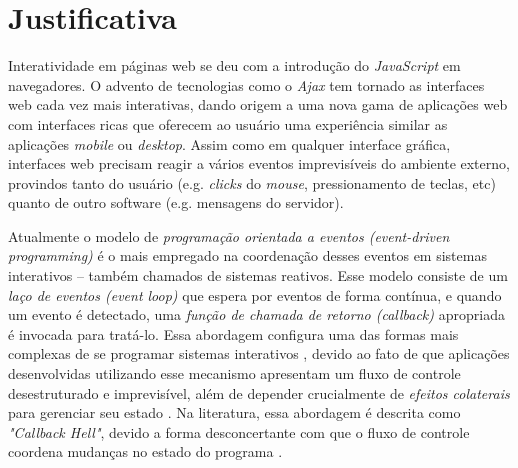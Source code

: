 \section{Justificativa}\label{ljustificativa}

Interatividade em páginas web se deu com a
introdução do \emph{JavaScript} em navegadores.
O advento de tecnologias como o \emph{Ajax} tem tornado as interfaces
web cada vez mais interativas,
dando origem a uma nova gama de aplicações web
com interfaces ricas que oferecem ao usuário uma experiência
similar as aplicações \textit{mobile} ou \textit{desktop}.
Assim como em qualquer interface gráfica, interfaces web
precisam reagir a vários eventos imprevisíveis do ambiente
externo, provindos tanto do usuário (e.g. \textit{clicks}
do \textit{mouse}, pressionamento de teclas, etc)
quanto de outro software (e.g. mensagens do servidor).

Atualmente o modelo de \emph{programação orientada a eventos
(event-driven programming)} é o mais empregado na
coordenação desses eventos em sistemas interativos
-- também chamados de sistemas reativos.
Esse modelo consiste de um \emph{laço de eventos (event loop)} que espera por
eventos de forma contínua, e quando um evento é detectado,
uma \emph{função de chamada de retorno (callback)}
apropriada é invocada para tratá-lo.
Essa abordagem configura uma das formas mais complexas de se
programar sistemas interativos \cite{
  edwards2009coherent,
  maier2010deprecating,
  reppy1992higher},
devido ao fato de que aplicações desenvolvidas utilizando
esse mecanismo apresentam um fluxo de controle desestruturado
e imprevisível, além de depender crucialmente de
\textit{efeitos colaterais\footnotemark} para
gerenciar seu estado \cite{
  meyerovich2009flapjax,
  muller2015interactive,
  muller2015practical}.
Na literatura, essa abordagem é descrita como \textit{"Callback Hell"},
devido a forma desconcertante com que o fluxo de controle coordena
mudanças no estado do programa \cite[p.~2]{edwards2009coherent}.

